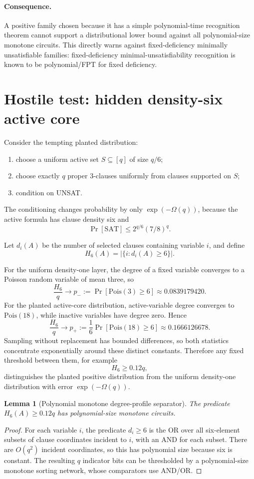 \documentclass[11pt]{article}
\newtheorem{lemma}{Lemma}
\begin{document}
\paragraph{Consequence.}
A positive family chosen because it has a simple polynomial-time recognition theorem cannot support a distributional lower bound against all polynomial-size monotone circuits. This directly warns against fixed-deficiency minimally unsatisfiable families: fixed-deficiency minimal-unsatisfiability recognition is known to be polynomial/FPT for fixed deficiency.

\section{Hostile test: hidden density-six active core}

Consider the tempting planted distribution:
\begin{enumerate}
\item choose a uniform active set \(S\subseteq[q]\) of size \(q/6\);
\item choose exactly \(q\) proper 3-clauses uniformly from clauses supported on \(S\);
\item condition on UNSAT.
\end{enumerate}
The conditioning changes probability by only \(\exp(-\Omega(q))\), because the active formula has clause density six and
\[
\Pr[\mathrm{SAT}]\le 2^{q/6}(7/8)^q.
\]

Let \(d_i(A)\) be the number of selected clauses containing variable \(i\), and define
\[
H_6(A)=|\{i:d_i(A)\ge6\}|.
\]

For the uniform density-one layer, the degree of a fixed variable converges to a Poisson random variable of mean three, so
\[
\frac{H_6}{q}\to
p_-:=\Pr[\mathrm{Pois}(3)\ge6]
\approx0.0839179420.
\]
For the planted active-core distribution, active-variable degree converges to \(\mathrm{Pois}(18)\), while inactive variables have degree zero. Hence
\[
\frac{H_6}{q}\to
p_+:=\frac16\Pr[\mathrm{Pois}(18)\ge6]
\approx0.1666126678.
\]
Sampling without replacement has bounded differences, so both statistics concentrate exponentially around these distinct constants. Therefore any fixed threshold between them, for example
\[
H_6\ge0.12q,
\]
distinguishes the planted positive distribution from the uniform density-one distribution with error \(\exp(-\Omega(q))\).

\begin{lemma}[Polynomial monotone degree-profile separator]
The predicate \(H_6(A)\ge0.12q\) has polynomial-size monotone circuits.
\end{lemma}
\begin{proof}
For each variable \(i\), the predicate \(d_i\ge6\) is the OR over all six-element subsets of clause coordinates incident to \(i\), with an AND for each subset. There are \(O(q^2)\) incident coordinates, so this has polynomial size because six is constant. The resulting \(q\) indicator bits can be thresholded by a polynomial-size monotone sorting network, whose comparators use AND/OR.
\end{proof}
\end{document}
